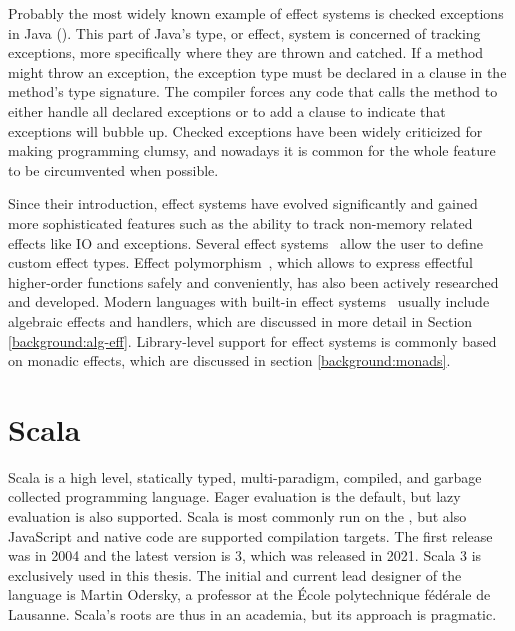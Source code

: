 Probably the most widely known example of effect systems is checked exceptions in Java (). This part of Java's type, or effect, system is concerned of tracking exceptions, more specifically where they are thrown and catched. If a method might throw an exception, the exception type must be declared in a  clause in the method's type signature. The compiler forces any code that calls the method to either handle all declared exceptions or to add a  clause to indicate that exceptions will bubble up. Checked exceptions have been widely criticized for making programming clumsy, and nowadays it is common for the whole feature to be circumvented when possible.



Since their introduction, effect systems have evolved significantly and gained more sophisticated features such as the ability to track non-memory related effects like IO and exceptions. Several effect systems~\cite{koka-lang, frank-lang} allow the user to define custom effect types. Effect polymorphism~\cite{polymorphic-alg-effs}, which allows to express effectful higher-order functions safely and conveniently, has also been actively researched and developed. Modern languages with built-in effect systems~\cite{unison-lang, ocaml-lang} usually include algebraic effects and handlers, which are discussed in more detail in Section \ref{background:alg-eff}. Library-level support for effect systems is commonly based on monadic effects, which are discussed in section \ref{background:monads}.





\section{Scala} \label{background:scala}
Scala is a high level, statically typed, multi-paradigm, compiled, and garbage collected programming language. Eager evaluation is the default, but lazy evaluation is also supported. Scala is most commonly run on the , but also JavaScript and native code are supported compilation targets. The first release was in 2004 and the latest version is 3, which was released in 2021. Scala 3 is exclusively used in this thesis. The initial and current lead designer of the language is Martin Odersky, a professor at the École polytechnique fédérale de Lausanne. Scala's roots are thus in an academia, but its approach is pragmatic.

